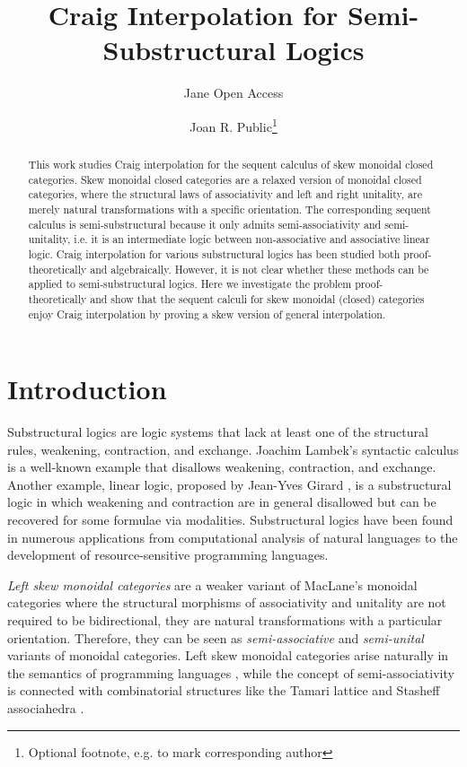 \documentclass[a4paper,UKenglish,cleveref, autoref, thm-restate, anonymous]{lipics-v2021}
\title{Craig Interpolation for Semi-{S}ubstructural Logics} %
\author{Jane {Open Access}}{Dummy University Computing Laboratory, [optional: Address], Country \and My second affiliation, Country \and \url{http://www.myhomepage.edu} }{johnqpublic@dummyuni.org}{https://orcid.org/0000-0002-1825-0097}{(Optional) author-specific funding acknowledgements}%
\author{Joan R. Public\footnote{Optional footnote, e.g. to mark corresponding author}}{Department of Informatics, Dummy College, [optional: Address], Country}{joanrpublic@dummycollege.org}{[orcid]}{[funding]}
\begin{document}
\maketitle

\begin{abstract}
This work studies Craig interpolation for the sequent calculus of skew monoidal closed categories.
Skew monoidal closed categories are a relaxed version of monoidal closed categories, where the structural laws of associativity and left and right unitality, are merely natural transformations with a specific orientation.
The corresponding sequent calculus is semi-substructural because it only admits semi-associativity and semi-unitality, i.e. it is an intermediate logic between non-associative and associative linear logic.
Craig interpolation for various substructural logics has been studied both proof-theoretically and algebraically.
However, it is not clear whether these methods can be applied to semi-substructural logics.
Here we investigate the problem proof-theoretically and show that the sequent calculi for skew monoidal (closed) categories enjoy Craig interpolation by proving a skew version of general interpolation.
\end{abstract}

\section{Introduction}\label{sec:intro}
Substructural logics are logic systems that lack at least one of the structural rules, weakening, contraction, and exchange.
Joachim Lambek's syntactic calculus \cite{lambek:mathematics:58} is a well-known example that disallows weakening, contraction, and exchange.
Another example, linear logic, proposed by Jean-Yves Girard \cite{girard:linear:87}, is a substructural logic in which weakening and contraction are in general disallowed but can be recovered for some formulae via modalities.
Substructural logics have been found in numerous applications from computational analysis of natural languages to the development of resource-sensitive programming languages.

\emph{Left skew monoidal categories} \cite{szlachanyi:skew-monoidal:2012} are a weaker variant of MacLane's monoidal categories where the structural morphisms of associativity and unitality are not required to be bidirectional, they are natural transformations with a particular orientation.
Therefore, they can be seen as \emph{semi-associative} and \emph{semi-unital} variants of monoidal categories. 
Left skew monoidal categories arise naturally in the semantics of programming languages \cite{altenkirch:monads:2014}, while the concept of semi-associativity is connected with combinatorial structures like the Tamari lattice and Stasheff associahedra \cite{zeilberger:semiassociative:19}.
\end{document}
